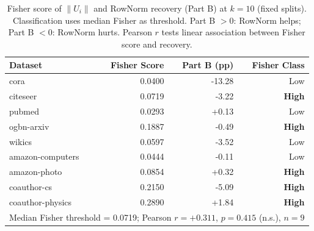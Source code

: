 \begin{table}[t]
\centering\small\setlength{\tabcolsep}{6pt}
\caption{Fisher score of $\|U_i\|$ and RowNorm recovery (Part B) at $k=10$ (fixed splits). Classification uses median Fisher as threshold. Part B $> 0$: RowNorm helps; Part B $< 0$: RowNorm hurts. Pearson $r$ tests linear association between Fisher score and recovery.}
\label{tab:fisher_partb_data}
\begin{tabular}{lrrr}
\toprule
Dataset & Fisher Score & Part B (pp) & Fisher Class \\
\midrule
cora & 0.0400 & -13.28 & Low \\
citeseer & 0.0719 & -3.22 & \textbf{High} \\
pubmed & 0.0293 & +0.13 & Low \\
ogbn\mbox{-}arxiv & 0.1887 & -0.49 & \textbf{High} \\
wikics & 0.0597 & -3.52 & Low \\
amazon\mbox{-}computers & 0.0444 & -0.11 & Low \\
amazon\mbox{-}photo & 0.0854 & +0.32 & \textbf{High} \\
coauthor\mbox{-}cs & 0.2150 & -5.09 & \textbf{High} \\
coauthor\mbox{-}physics & 0.2890 & +1.84 & \textbf{High} \\
\midrule
\multicolumn{4}{l}{Median Fisher threshold = 0.0719; Pearson $r = +0.311$, $p = 0.415$ (n.s.), $n = 9$} \\
\bottomrule\end{tabular}\end{table}